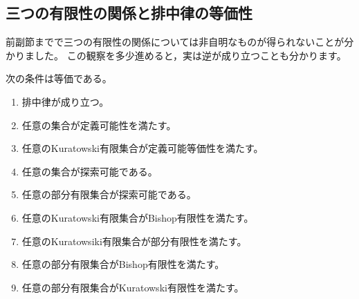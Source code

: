 \subsection{三つの有限性の関係と排中律の等価性}
前副節までで三つの有限性の関係については非自明なものが得られないことが分かりました。
この観察を多少進めると，実は逆が成り立つことも分かります。

\begin{proposition}\label{prop::characterize_lem}
    次の条件は等価である。
    \begin{enumerate}
        \item\label{prop::characterize_lem::item_1} 
            排中律が成り立つ。
        \item\label{prop::characterize_lem::item_2}  
            任意の集合が定義可能性を満たす。
        \item\label{prop::characterize_lem::item_3}  
            任意のKuratowski有限集合が定義可能等価性を満たす。
        \item\label{prop::characterize_lem::item_4}
            任意の集合が探索可能である。
        \item\label{prop::characterize_lem::item_5}  
            任意の部分有限集合が探索可能である。
        \item\label{prop::characterize_lem::item_6}  
            任意のKuratowski有限集合がBishop有限性を満たす。
        \item\label{prop::characterize_lem::item_7}  
            任意のKuratowsiki有限集合が部分有限性を満たす。
        \item\label{prop::characterize_lem::item_8}  
            任意の部分有限集合がBishop有限性を満たす。
        \item\label{prop::characterize_lem::item_9}  
            任意の部分有限集合がKuratowski有限性を満たす。
    \end{enumerate}
\end{proposition}


